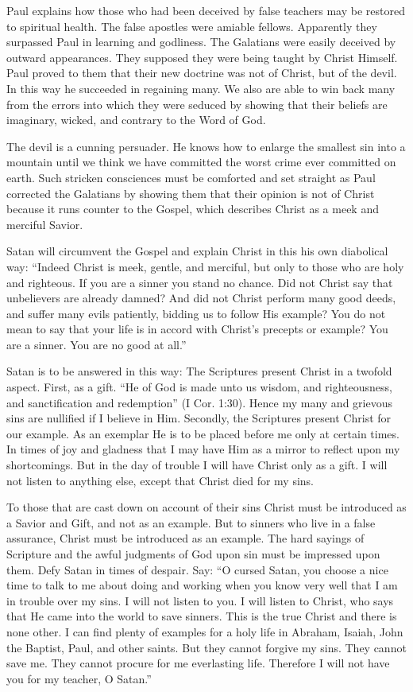 Paul explains how those who had been deceived by false teachers may be restored to spiritual health. The false apostles were amiable fellows. Apparently they surpassed Paul in learning and godliness. The Galatians were easily deceived by outward appearances. They supposed they were being taught by Christ Himself. Paul proved to them that their new doctrine was not of Christ, but of the devil. In this way he succeeded in regaining many. We also are able to win back many from the errors into which they were seduced by showing that their beliefs are imaginary, wicked, and contrary to the Word of God.

The devil is a cunning persuader. He knows how to enlarge the smallest sin into a mountain until we think we have committed the worst crime ever committed on earth. Such stricken consciences must be comforted and set straight as Paul corrected the Galatians by showing them that their opinion is not of Christ because it runs counter to the Gospel, which describes Christ as a meek and merciful Savior.

Satan will circumvent the Gospel and explain Christ in this his own diabolical way: “Indeed Christ is meek, gentle, and merciful, but only to those who are holy and righteous. If you are a sinner you stand no chance. Did not Christ say that unbelievers are already damned? And did not Christ perform many good deeds, and suffer many evils patiently, bidding us to follow His example? You do not mean to say that your life is in accord with Christ’s precepts or example? You are a sinner. You are no good at all.”

Satan is to be answered in this way: The Scriptures present Christ in a twofold aspect. First, as a gift. “He of God is made unto us wisdom, and righteousness, and sanctification and redemption” (I Cor. 1:30). Hence my many and grievous sins are nullified if I believe in Him. Secondly, the Scriptures present Christ for our example. As an exemplar He is to be placed before me only at certain times. In times of joy and gladness that I may have Him as a mirror to reflect upon my shortcomings. But in the day of trouble I will have Christ only as a gift. I will not listen to anything else, except that Christ died for my sins.

To those that are cast down on account of their sins Christ must be introduced as a Savior and Gift, and not as an example. But to sinners who live in a false assurance, Christ must be introduced as an example. The hard sayings of Scripture and the awful judgments of God upon sin must be impressed upon them. Defy Satan in times of despair. Say: “O cursed Satan, you choose a nice time to talk to me about doing and working when you know very well that I am in trouble over my sins. I will not listen to you. I will listen to Christ, who says that He came into the world to save sinners. This is the true Christ and there is none other. I can find plenty of examples for a holy life in Abraham, Isaiah, John the Baptist, Paul, and other saints. But they cannot forgive my sins. They cannot save me. They cannot procure for me everlasting life. Therefore I will not have you for my teacher, O Satan.”

